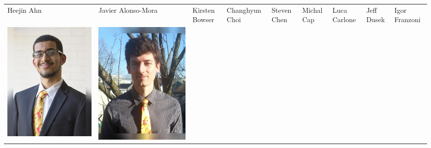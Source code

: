 \documentclass[landscape,a0paper,fontscale=0.292]{baposter}
\begin{document}
\begin{poster}
{\begin{center}
\begin{tabularx}{\linewidth}{X X X X X X X X X}
{\tiny \centering Heejin Ahn }& {\tiny \centering Javier Alonso-Mora }& {\tiny \centering Kirsten Bowser }& {\tiny \centering Changhyun Choi }& {\tiny \centering Steven Chen }& {\tiny \centering Michal Cap }& {\tiny \centering Luca Carlone }& {\tiny \centering Jeff Dusek }& {\tiny \centering Igor Franzoni }\\ 
 {\centering \includegraphics[width=0.65\linewidth]{garcia-mallen.jpg}}&
{\centering \includegraphics[width=0.65\linewidth]{hoehener.jpg}}&

\end{tabularx}
\end{center}}
\end{poster}
\end{document}
